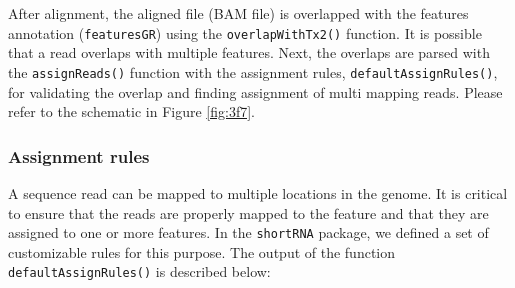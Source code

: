 \documentclass[12pt,twoside]{reedthesis}
\begin{document}
After alignment, the aligned file (BAM file) is overlapped with the
features annotation (\texttt{featuresGR}) using the \texttt{overlapWithTx2()}
function. It is possible that a read overlaps with multiple features.
Next, the overlaps are parsed with the \texttt{assignReads()} function with the
assignment rules, \texttt{defaultAssignRules()}, for validating the overlap and
finding assignment of multi mapping reads. Please refer to the schematic
in Figure \ref{fig:3f7}.

\hypertarget{assignment-rules}{%
\subsubsection{Assignment rules}\label{assignment-rules}}

A sequence read can be mapped to multiple locations in the genome. It is
critical to ensure that the reads are properly mapped to the feature and
that they are assigned to one or more features. In the \texttt{shortRNA}
package, we defined a set of customizable rules for this purpose. The
output of the function \texttt{defaultAssignRules()} is described below:
\end{document}
